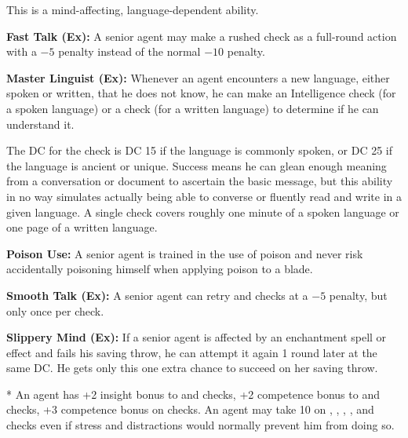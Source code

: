 This is a mind-affecting, language-dependent ability.

\textbf{Fast Talk (Ex):} A senior agent may make a rushed  check as a full-round action with a $-5$ penalty instead of the normal $-10$ penalty.

\textbf{Master Linguist (Ex):} Whenever an agent encounters a new language, either spoken or written, that he does not know, he can make an Intelligence check (for a spoken language) or a  check (for a written language) to determine if he can understand it.

The DC for the check is DC 15 if the language is commonly spoken, or DC 25 if the language is ancient or unique. Success means he can glean enough meaning from a conversation or document to ascertain the basic message, but this ability in no way simulates actually being able to converse or fluently read and write in a given language. A single check covers roughly one minute of a spoken language or one page of a written language.

\textbf{Poison Use:} A senior agent is trained in the use of poison and never risk accidentally poisoning himself when applying poison to a blade.

\textbf{Smooth Talk (Ex):} A senior agent can retry  and  checks at a $-5$ penalty, but only once per check.

\textbf{Slippery Mind (Ex):} If a senior agent is affected by an enchantment spell or effect and fails his saving throw, he can attempt it again 1 round later at the same DC. He gets only this one extra chance to succeed on her saving throw.

* An agent has +2 insight bonus to  and  checks, +2 competence bonus to  and  checks, +3 competence bonus on  checks. An agent may take 10 on , , , , and  checks even if stress and distractions would normally prevent him from doing so.



